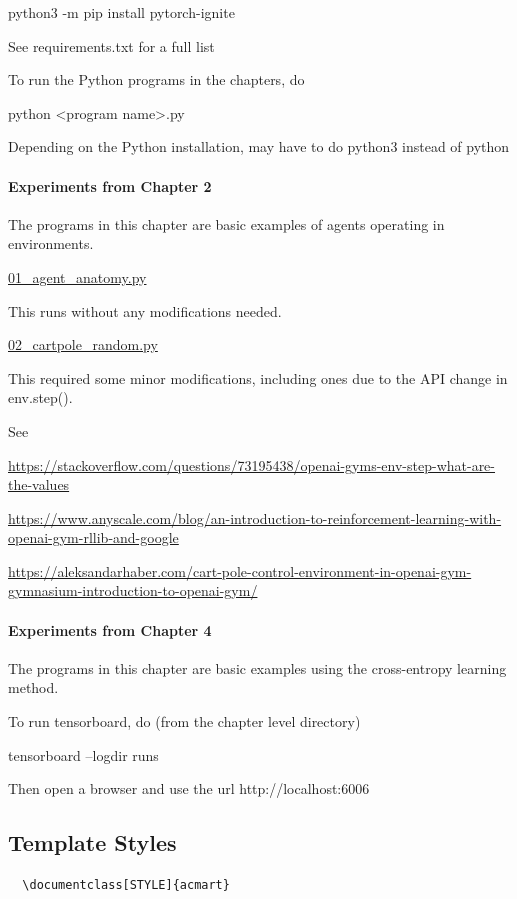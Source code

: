 \documentclass[acmlarge,screen]{acmart}
\begin{document}
python3 -m pip install pytorch-ignite


See requirements.txt for a full list


To run the Python programs in the chapters, do

python <program name>.py

Depending on the Python installation, may have to do python3 instead of python


\paragraph{Experiments from Chapter 2} The programs in this chapter are basic examples of agents operating in environments.

\underline{01\_agent\_anatomy.py}

This runs without any modifications needed.

\underline{02\_cartpole\_random.py}

This required some minor modifications, including ones due to the API change in env.step().

See

\noindent \url{https://stackoverflow.com/questions/73195438/openai-gyms-env-step-what-are-the-values}

\noindent \url{https://www.anyscale.com/blog/an-introduction-to-reinforcement-learning-with-openai-gym-rllib-and-google}

\noindent \url{https://aleksandarhaber.com/cart-pole-control-environment-in-openai-gym-gymnasium-introduction-to-openai-gym/}


\paragraph{Experiments from Chapter 4} The programs in this chapter are basic examples using the cross-entropy learning method.

To run tensorboard, do (from the chapter level directory)

tensorboard --logdir runs

Then open a browser and use the url http://localhost:6006




\subsection{Template Styles}


\begin{verbatim}
  \documentclass[STYLE]{acmart}
\end{verbatim}
\end{document}
